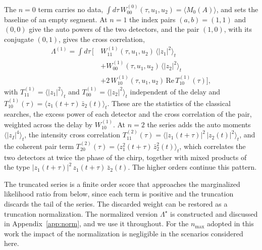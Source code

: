 \documentclass[aps,prd,twocolumn,superscriptaddress,nofootinbib]{revtex4-2}
\begin{document}
The $n = 0$ term
carries no data, $\int d\tau\, W^{(0)}_{00}(\tau, u_1, u_2) =
\langle M_0(A) \rangle$, and sets the baseline of an empty segment.
At $n = 1$ the index pairs $(a, b) = (1, 1)$ and $(0, 0)$ give the
auto powers of the two detectors, and the pair $(1, 0)$, with its
conjugate $(0, 1)$, gives the cross correlation,
\begin{equation}
\begin{aligned}
\Lambda^{(1)} = \int d\tau\, \Big[\,
& W^{(1)}_{11}(\tau, u_1, u_2)\, \langle |z_1|^2 \rangle_t \\
& + W^{(1)}_{00}(\tau, u_1, u_2)\, \langle |z_2|^2 \rangle_t \\
& + 2\, W^{(1)}_{10}(\tau, u_1, u_2)\, \mathrm{Re}\, T^{(1)}_{10}(\tau)
\Big],
\end{aligned}
\label{eq:order1}
\end{equation}
with $T^{(1)}_{11} = \langle |z_1|^2 \rangle_t$ and
$T^{(1)}_{00} = \langle |z_2|^2 \rangle_t$ independent of the delay
and $T^{(1)}_{10}(\tau) = \langle z_1(t + \tau)\, \bar z_2(t)
\rangle_t$. These are the statistics of the classical searches, the
excess power of each detector and the cross correlation of the pair,
weighted across the delay by $W^{(1)}_{10}$. At $n = 2$ the series
adds the auto moments $\langle |z_I|^4 \rangle_t$, the intensity
cross correlation $T^{(2)}_{11}(\tau) =
\langle |z_1(t + \tau)|^2\, |z_2(t)|^2 \rangle_t$, and the coherent
pair term $T^{(2)}_{20}(\tau) =
\langle z_1^2(t + \tau)\, \bar z_2^2(t) \rangle_t$, which correlates
the two detectors at twice the phase of the chirp, together with
mixed products of the type
$|z_1(t + \tau)|^2\, z_1(t + \tau)\, \bar z_2(t)$. The higher orders
continue this pattern.

The truncated series is a finite order score that approaches the
marginalized likelihood ratio from below, since each term is positive
and the truncation discards the tail of the series. The discarded
weight can be restored as a truncation normalization. The normalized
version $\Lambda^\star$ is constructed and discussed in
Appendix~\ref{app:norm}, and we use it throughout. For the $n_{\max}$
adopted in this work the impact of the normalization is negligible in
the scenarios considered here.
\end{document}
